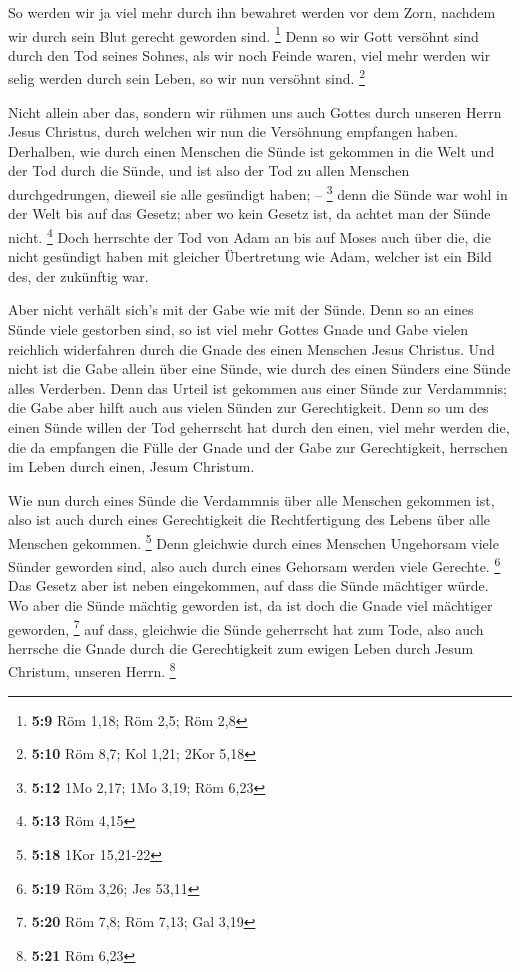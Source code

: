  So werden wir ja viel mehr durch ihn bewahret werden vor
dem Zorn, nachdem wir durch sein Blut gerecht geworden sind. \footnote{\textbf{5:9}
  Röm 1,18; Röm 2,5; Röm 2,8}  Denn so wir Gott versöhnt
sind durch den Tod seines Sohnes, als wir noch Feinde waren, viel mehr
werden wir selig werden durch sein Leben, so wir nun versöhnt sind.
\footnote{\textbf{5:10} Röm 8,7; Kol 1,21; 2Kor 5,18}

 Nicht allein aber das, sondern wir rühmen uns auch
Gottes durch unseren Herrn Jesus Christus, durch welchen wir nun die
Versöhnung empfangen haben.  Derhalben, wie durch einen
Menschen die Sünde ist gekommen in die Welt und der Tod durch die Sünde,
und ist also der Tod zu allen Menschen durchgedrungen, dieweil sie alle
gesündigt haben; -- \footnote{\textbf{5:12} 1Mo 2,17; 1Mo 3,19; Röm 6,23}
 denn die Sünde war wohl in der Welt bis auf das Gesetz;
aber wo kein Gesetz ist, da achtet man der Sünde nicht. \footnote{\textbf{5:13}
  Röm 4,15}  Doch herrschte der Tod von Adam an bis auf
Moses auch über die, die nicht gesündigt haben mit gleicher Übertretung
wie Adam, welcher ist ein Bild des, der zukünftig war.

 Aber nicht verhält sich's mit der Gabe wie mit der
Sünde. Denn so an eines Sünde viele gestorben sind, so ist viel mehr
Gottes Gnade und Gabe vielen reichlich widerfahren durch die Gnade des
einen Menschen Jesus Christus.  Und nicht ist die Gabe
allein über eine Sünde, wie durch des einen Sünders eine Sünde alles
Verderben. Denn das Urteil ist gekommen aus einer Sünde zur Verdammnis;
die Gabe aber hilft auch aus vielen Sünden zur Gerechtigkeit.
 Denn so um des einen Sünde willen der Tod geherrscht hat
durch den einen, viel mehr werden die, die da empfangen die Fülle der
Gnade und der Gabe zur Gerechtigkeit, herrschen im Leben durch einen,
Jesum Christum.

 Wie nun durch eines Sünde die Verdammnis über alle
Menschen gekommen ist, also ist auch durch eines Gerechtigkeit die
Rechtfertigung des Lebens über alle Menschen gekommen. \footnote{\textbf{5:18}
  1Kor 15,21-22}  Denn gleichwie durch eines Menschen
Ungehorsam viele Sünder geworden sind, also auch durch eines Gehorsam
werden viele Gerechte. \footnote{\textbf{5:19} Röm 3,26; Jes 53,11}
 Das Gesetz aber ist neben eingekommen, auf dass die
Sünde mächtiger würde. Wo aber die Sünde mächtig geworden ist, da ist
doch die Gnade viel mächtiger geworden, \footnote{\textbf{5:20} Röm 7,8;
  Röm 7,13; Gal 3,19}  auf dass, gleichwie die Sünde
geherrscht hat zum Tode, also auch herrsche die Gnade durch die
Gerechtigkeit zum ewigen Leben durch Jesum Christum, unseren Herrn.
\footnote{\textbf{5:21} Röm 6,23}

